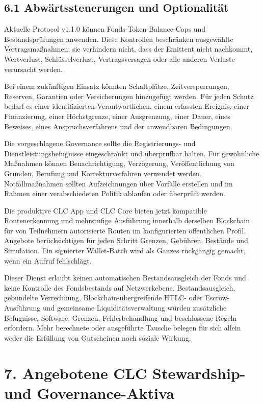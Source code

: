 \documentclass[11pt]{article}
\begin{document}
\subsection*{6.1 Abwärtssteuerungen und Optionalität}

Aktuelle Protocol v1.1.0 können Fonds-Token-Balance-Caps und Bestandsprüfungen anwenden. Diese Kontrollen beschränken ausgewählte Vertragsmaßnahmen; sie verhindern nicht, dass der Emittent nicht nachkommt, Wertverlust, Schlüsselverlust, Vertragsversagen oder alle anderen Verluste verursacht werden.

Bei einem zukünftigen Einsatz könnten Schaltplätze, Zeitversperrungen, Reserven, Garantien oder Versicherungen hinzugefügt werden. Für jeden Schutz bedarf es einer identifizierten Verantwortlichen, einem erfassten Ereignis, einer Finanzierung, einer Höchstgrenze, einer Ausgrenzung, einer Dauer, eines Beweises, eines Anspruchsverfahrens und der anwendbaren Bedingungen.

Die vorgeschlagene Governance sollte die Registrierungs- und Dienstleistungsbefugnisse eingeschränkt und überprüfbar halten. Für gewöhnliche Maßnahmen können Benachrichtigung, Verzögerung, Veröffentlichung von Gründen, Berufung und Korrekturverfahren verwendet werden. Notfallmaßnahmen sollten Aufzeichnungen über Vorfälle erstellen und im Rahmen einer verabschiedeten Politik ablaufen oder überprüft werden.

Die produktive CLC App und CLC Core bieten jetzt kompatible Routenerkennung und mehrstufige Ausführung innerhalb derselben Blockchain für von Teilnehmern autorisierte Routen im konfigurierten öffentlichen Profil. Angebote berücksichtigen für jeden Schritt Grenzen, Gebühren, Bestände und Simulation. Ein signierter Wallet-Batch wird als Ganzes rückgängig gemacht, wenn ein Aufruf fehlschlägt.

Dieser Dienst erlaubt keinen automatischen Bestandsausgleich der Fonds und keine Kontrolle des Fondsbestands auf Netzwerkebene. Bestandsausgleich, gebündelte Verrechnung, Blockchain-übergreifende HTLC- oder Escrow-Ausführung und gemeinsame Liquiditätsverwaltung würden zusätzliche Befugnisse, Software, Grenzen, Fehlerbehandlung und beschlossene Regeln erfordern. Mehr berechnete oder ausgeführte Tausche belegen für sich allein weder die Erfüllung von Gutscheinen noch soziale Wirkung.


\section*{7. Angebotene CLC Stewardship- und Governance-Aktiva}
\end{document}
